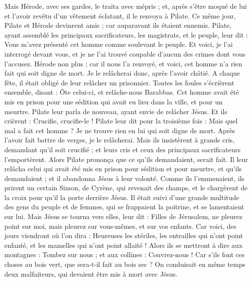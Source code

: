 \begin{multicols}{2}
Mais Hérode, avec ses gardes, le traita avec mépris ; et, après s’être moqué de lui et l’avoir revêtu d'un vêtement éclatant, il le renvoya à Pilate.
Ce même jour, Pilate et Hérode devinrent amis ; car auparavant ils étaient ennemis.
Pilate, ayant assemblé les principaux sacrificateurs, les magistrats, et le peuple, leur dit :
Vous m'avez présenté cet homme comme soulevant le peuple. Et voici, je l’ai interrogé devant vous, et je ne l’ai trouvé coupable d’aucun des crimes dont vous l'accusez.
Hérode non plus ; car il nous l’a renvoyé, et voici, cet homme n’a rien fait qui soit digne de mort.
Je le relâcherai donc, après l’avoir châtié.
A chaque fête, il était obligé de leur relâcher un prisonnier.
Toutes les foules s'écrièrent ensemble, disant : Ôte celui-ci, et relâche-nous Barabbas.
Cet homme avait été mis en prison pour une sédition qui avait eu lieu dans la ville, et pour un meurtre.
Pilate leur parla de nouveau, ayant envie de relâcher Jésus.
Et ils crièrent : Crucifie, crucifie-le !
Pilate leur dit pour la troisième fois : Mais quel mal a fait cet homme ? Je ne trouve rien en lui qui soit digne de mort. Après l’avoir fait battre de verges, je le relâcherai.
Mais ils insistèrent à grands cris, demandant qu'il soit crucifié ; et leurs cris et ceux des principaux sacrificateurs l’emportèrent.
Alors Pilate prononça que ce qu'ils demandaient, serait fait.
Il leur relâcha celui qui avait été mis en prison pour sédition et pour meurtre, et qu’ils demandaient ; et il abandonna Jésus à leur volonté.
Comme ils l'emmenaient, ils prirent un certain Simon, de Cyrène, qui revenait des champs, et le chargèrent de la croix pour qu’il la porte derrière Jésus.
Il était suivi d'une grande multitude des gens du peuple et de femmes, qui se frappaient la poitrine, et se lamentaient sur lui.
Mais Jésus se tourna vers elles, leur dit : Filles de Jérusalem, ne pleurez point sur moi, mais pleurez sur vous-mêmes, et sur vos enfants.
Car voici, des jours viendront où l’on dira : Heureuses les stériles, les entrailles qui n’ont point enfanté, et les mamelles qui n'ont point allaité !
Alors ils se mettront à dire aux montagnes : Tombez sur nous ; et aux collines : Couvrez-nous !
Car s'ils font ces choses au bois vert, que sera-t-il fait au bois sec ?
On conduisait en même temps deux malfaiteurs, qui devaient être mis à mort avec Jésus.

\end{multicols}
